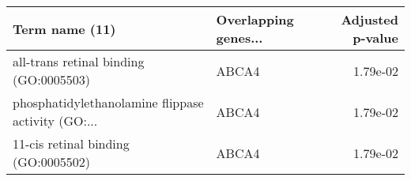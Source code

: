\begin{tabular}{llr}
\toprule
                                    Term name (11) & Overlapping genes... &  Adjusted p-value \\
\midrule
            all-trans retinal binding (GO:0005503) &                ABCA4 &          1.79e-02 \\
phosphatidylethanolamine flippase activity (GO:... &                ABCA4 &          1.79e-02 \\
               11-cis retinal binding (GO:0005502) &                ABCA4 &          1.79e-02 \\
\bottomrule
\end{tabular}
